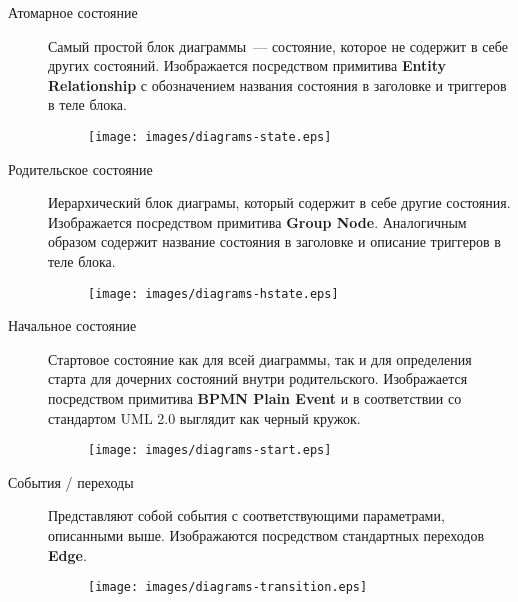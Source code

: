 \documentclass[12pt,a4paper]{article}
\begin{document}
\begin{description}
\item[Атомарное состояние] Самый простой блок диаграммы~--- состояние, которое не содержит
  в себе других состояний. Изображается посредством примитива \textbf{Entity Relationship}
  с обозначением названия состояния в заголовке и триггеров в теле блока.

\begin{figure}[h]
  \begin{center}
    \texttt{[image: images/diagrams-state.eps]}
  \end{center}
\end{figure}

\item[Родительское состояние] Иерархический блок диаграмы, который содержит в себе другие
  состояния. Изображается посредством примитива \textbf{Group Node}. Аналогичным образом
  содержит название состояния в заголовке и описание триггеров в теле блока.

\begin{figure}[h]
  \begin{center}
    \texttt{[image: images/diagrams-hstate.eps]}
  \end{center}
\end{figure}

\item[Начальное состояние] Стартовое состояние как для всей диаграммы, так и для
  определения старта для дочерних состояний внутри родительского. Изображается посредством
  примитива \textbf{BPMN Plain Event} и в соответствии со стандартом UML 2.0 выглядит как
  черный кружок.
  
\begin{figure}[h]
  \begin{center}
    \texttt{[image: images/diagrams-start.eps]}
  \end{center}
\end{figure}
  
\item[События / переходы] Представляют собой события с соответствующими параметрами,
  описанными выше. Изображаются посредством стандартных переходов \textbf{Edge}.

\begin{figure}[h]
  \begin{center}
    \texttt{[image: images/diagrams-transition.eps]}
  \end{center}
\end{figure}
  

\end{description}
\end{document}
